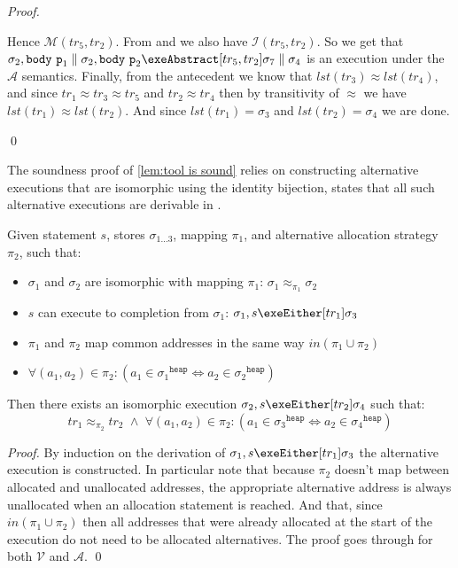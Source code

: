 \documentclass[runningheads,a4paper]{llncs}
\DeclareMathOperator{\band}{\bm{\;\land\;}}
\DeclareMathOperator{\suchthat}{:}
\newcommand*{\qvars}[2]{#1_{#2}}
\newcommand*{\last}[1]{\mathit{lst}(#1)}
\newcommand{\tr}{tr}
\newcommand*\iso{\approx}
\newcommand*{\parcomp}{\parallel}
\newcommand*\Asemantics{\mathcal{A}}
\newcommand*\asemantics{$\Asemantics$ semantics}
\newcommand*\Vsemantics{\mathcal{V}}
\newcommand*{\body}{\mathtt{body}}
\newcommand*{\fun}{\texttt{p}}
\newcommand*{\bijection}[1]{\mathit{in}{\left(#1\right)}}
\newcommand*{\isoR}{\mathcal{I}}
\newcommand*{\mutR}{\mathcal{M}}
\newcommand*{\store}{\sigma}
\newcommand*{\heapof}[1]{{#1}^{\mathtt{heap}}}
\begin{document}
\begin{proof}
\begin{itemize}
Hence $\mutR(\tr_5,\tr_2)$. From \tagfive{} and \tagsix{} we also have $\isoR(\tr_5,\tr_2)$. So we get that $\store_2,\body~\fun_1\parcomp\store_2,\body~\fun_2\exeAbstract[\tr_5,\tr_2]\store_7\parcomp\store_4$ is an execution under the \asemantics{}.
%
Finally, from the antecedent we know that $\last{\tr_3}\iso\last{\tr_4}$, and since $\tr_1\iso\tr_3\iso\tr_5$ and $\tr_2\iso\tr_4$ then by transitivity of $\iso$ we have $\last{\tr_1}\iso\last{\tr_2}$. And since $\last{\tr_1}=\store_3$ and $\last{\tr_2}=\store_4$ we are done.
%
\end{itemize}\qed\end{proof}

The soundness proof of \cref{lem:tool is sound} relies on constructing alternative executions that are isomorphic using the identity bijection,  states that all such alternative executions are derivable in \lang{}.

\begin{lemma}\label{lem:sufficient non-determinism}\setlength{\parindent}{0cm}
Given statement $s$, stores $\qvars{\store}{1 \ldots 3}$, mapping $\pi_1$, and alternative allocation strategy $\qvars{\pi}{2}$, such that:
\begin{itemize}
	\item $\store_1$ and $\store_2$ are isomorphic with mapping $\pi_1$: $\store_1 \iso_{\pi_1} \store_2$
	\item $s$ can execute to completion from $\store_1$: $\store_1,s\exeEither[\tr_1]\store_3$
	\item $\pi_1$ and $\pi_2$ map common addresses in the same way $\bijection{\pi_1 \cup \pi_2}$
	\item %
		$\forall (a_1,a_2) \in \pi_2 \suchthat (a_1 \in \heapof{\store_1} \iff a_2 \in \heapof{\store_2})$
\end{itemize}

Then there exists an isomorphic execution $\store_2,s\exeEither[\tr_2]\store_4$ such that:
	\[\tr_1 \iso_{\pi_2} \tr_2 \band \forall (a_1,a_2) \in \pi_2 \suchthat (a_1 \in \heapof{\store_3} \iff a_2 \in \heapof{\store_4})\]
\end{lemma}
\begin{proof}By induction on the derivation of $\store_1,s\exeEither[\tr_1]\store_3$ the alternative execution is constructed. In particular note that because $\pi_2$ doesn't map between allocated and unallocated addresses, the appropriate alternative address is always unallocated when an allocation statement is reached. And that, since $\bijection{\pi_1 \cup \pi_2}$ then all addresses that were already allocated at the start of the execution do not need to be allocated alternatives. The proof goes through for both $\Vsemantics$ and $\Asemantics$.
\qed\end{proof}
\end{document}
